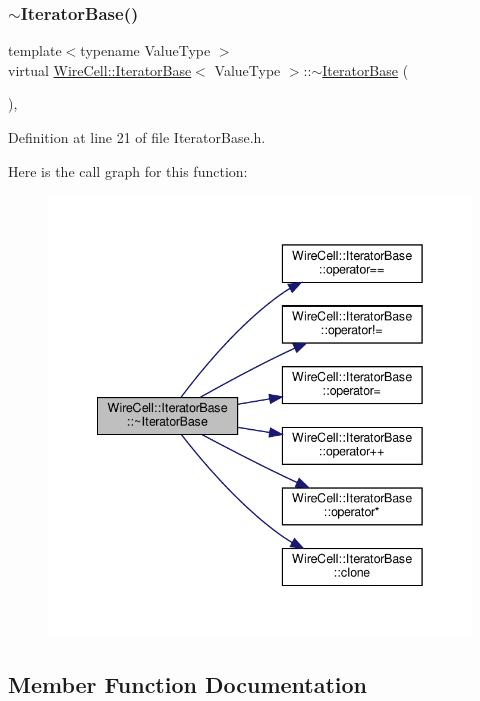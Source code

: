 \subsubsection{\texorpdfstring{$\sim$\+Iterator\+Base()}{~IteratorBase()}}
{\footnotesize\ttfamily template$<$typename Value\+Type $>$ \\
virtual \hyperlink{class_wire_cell_1_1_iterator_base}{Wire\+Cell\+::\+Iterator\+Base}$<$ Value\+Type $>$\+::$\sim$\hyperlink{class_wire_cell_1_1_iterator_base}{Iterator\+Base} (\begin{DoxyParamCaption}{ }\end{DoxyParamCaption})\hspace{0.3cm}{\ttfamily [inline]}, {\ttfamily [virtual]}}



Definition at line 21 of file Iterator\+Base.\+h.

Here is the call graph for this function\+:
\nopagebreak
\begin{figure}[H]
\begin{center}
\leavevmode
\includegraphics[width=342pt]{class_wire_cell_1_1_iterator_base_ae1705c915b813d46644cfeb09c94b505_cgraph}
\end{center}
\end{figure}


\subsection{Member Function Documentation}
\mbox{\label{class_wire_cell_1_1_iterator_base_a6bb7f1f53c37dc1518291f09f493f2be}} 
